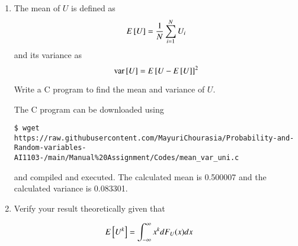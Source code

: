 \documentclass[journal,12pt,twocolumn]{IEEEtran}
\renewcommand\thesection{\arabic{section}}
\begin{document}
\begin{enumerate}[label=\thesection.\arabic*
,ref=\thesection.\theenumi]
\solution
The CDF of $U$ is given by
		\begin{align}
			F_U(x) = \pr{U \leq x} = \int_{-\infty}^{x}p_U(u)du
		\end{align}
We now have three cases:
		\begin{enumerate}
			\item $x < 0$: $p_X(x) = 0$, and hence $F_U(x) = 0$.
			\item $0 \leq x < 1$: Here,
				\begin{align}
					F_U(x) = \int_{0}^{x}du = x
					\label{eq:cdf-uni}
				\end{align}
			\item $x \geq 1$: Put $x = 1$ in \eqref{eq:cdf-uni} as $U$ is uniform in [0, 1] to get $F_U(x) = 1$.
		\end{enumerate}
Therefore,
		\begin{align}
			F_U(x) = 
			\begin{cases}
				0 & x < 0 \\
				x & 0 \leq x < 1 \\
				1 & x \geq 1
			\end{cases}
			\label{eq:cdf-ans}
		\end{align}
This is verified in Figure \eqref{fig:uni_cdf}
\item
The mean of $U$ is defined as
%
\begin{equation}
E{}\left[U\right] = \frac{1}{N}\sum_{i=1}^{N}U_i
	\label{eq:mean-form}
\end{equation}
%
and its variance as
%
\begin{equation}
\text{var}{}\left[U\right] = E{}\left[U- E{}\left[U\right]\right]^2 
	\label{eq:var-form}
\end{equation}

Write a C program to  find the mean and variance of $U$.

\solution
The C program can be downloaded using
\begin{lstlisting}
$ wget https://raw.githubusercontent.com/MayuriChourasia/Probability-and-Random-variables-AI1103-/main/Manual%20Assignment/Codes/mean_var_uni.c
\end{lstlisting}
and compiled and executed.
The calculated mean is 0.500007 and the calculated variance is 0.083301.

\item Verify your result theoretically given that
\end{enumerate}
%
\begin{equation}
E{}\left[U^k\right] = \int_{-\infty}^{\infty}x^kdF_{U}(x)dx
\end{equation}
\end{document}
